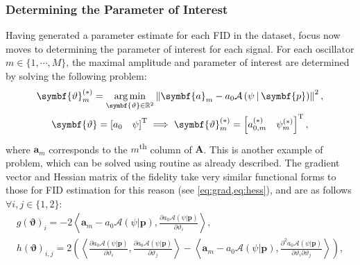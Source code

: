 \subsubsection{Determining the Parameter of Interest}
Having generated a parameter estimate for each \ac{FID} in the dataset, focus
now moves to determining the parameter of interest for each signal.
For each oscillator $m \in \lbrace 1, \cdots, M \rbrace$, the maximal amplitude
and parameter of interest are determined by solving the following problem:
\begin{subequations}
    \begin{gather}
        \symbf{\vartheta}_m^{(*)} = \argmin_{\symbf{\vartheta} \in \mathbb{R}^2}
        \left\lVert
            \symbf{a}_m - a_0 \mathcal{A} \left(\psi \hspace*{2pt} | \hspace*{2pt} \symbf{p}\right)
        \right\rVert^2,\\
        \symbf{\vartheta} = \left[ a_0 \hspace{10pt} \psi \right]\T \implies
        \symbf{\vartheta}_{m}^{(*)} = \left[ a_{0,m}^{(*)}  \hspace{10pt} \psi_{m}^{(*)} \right]\T,
    \end{gather}
\end{subequations}
where $\symbf{a}_m$ corresponds to the $m$\textsuperscript{th} column of
$\symbf{A}$.  This is another example of  problem, which can be solved using
 routine as already described. The gradient vector and Hessian matrix
of the fidelity take very similar functional forms to those for \ac{FID}
estimation for this reason (see \cref{eq:grad,eq:hess}), and are as
follows $\forall
i, j \in \lbrace 1, 2 \rbrace$:
\begin{subequations}
    \begin{gather}
        g(\symbf{\vartheta})_i =
            -2 \left \langle
                \symbf{a}_m - a_0 \mathcal{A}(\psi | \symbf{p}),
                \frac{\partial a_0 \mathcal{A} (\psi | \symbf{p})}
                {\partial \vartheta_i}
            \right \rangle,\\
        h(\symbf{\vartheta})_{i,j} =
            2 \left( \left \langle
                \frac{\partial a_0 \mathcal{A} (\psi | \symbf{p})}{\partial \vartheta_i},
                \frac{\partial a_0 \mathcal{A} (\psi | \symbf{p})}{\partial \vartheta_j}
            \right \rangle -
            \left \langle
                \symbf{a}_m - a_0 \mathcal{A}(\psi | \symbf{p}),
                \frac{\partial^2 a_0 \mathcal{A} (\psi | \symbf{p})}{\partial
                \vartheta_i\partial \vartheta_j}
            \right \rangle \right),
            \label{eq:seq-hessian}\\
    \end{gather}
\end{subequations}
